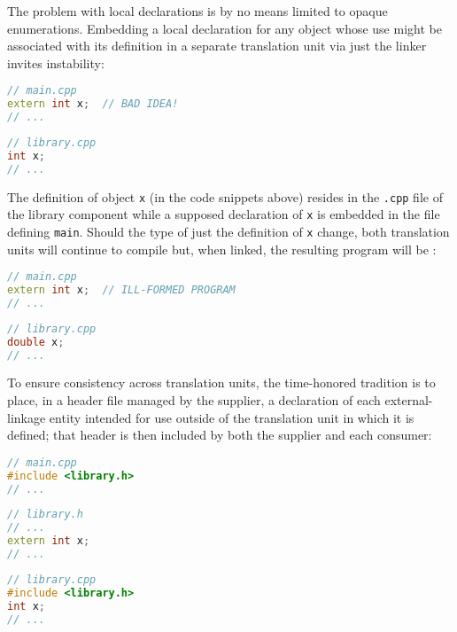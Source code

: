 The problem with local declarations is by no means limited to opaque
enumerations. Embedding a local declaration for any object whose use
might be associated with its definition in a separate translation unit
via just the linker invites instability:

\noindent\begin{minipage}{.45\textwidth}
\begin{lstlisting}[language=C++]
// main.cpp
extern int x;  // BAD IDEA!
// ...
\end{lstlisting}
\end{minipage}\hfill
\begin{minipage}{.45\textwidth}
\begin{lstlisting}[language=C++]
// library.cpp
int x;
// ...
\end{lstlisting}
\end{minipage}

\noindent The definition of object \lstinline!x! (in the code snippets above) resides
in the \lstinline!.cpp! file of the library component while a supposed
declaration of \lstinline!x! is embedded in the file defining
\lstinline!main!. Should the type of just the definition of \lstinline!x!
change, both translation units will continue to compile but, when
linked, the resulting program will be :

\noindent\begin{minipage}{.65\textwidth}
\begin{lstlisting}[language=C++]
// main.cpp
extern int x;  // ILL-FORMED PROGRAM
// ...
\end{lstlisting}
\end{minipage}\hfill
\begin{minipage}{.35\textwidth}
\begin{lstlisting}[language=C++]
// library.cpp
double x;
// ...
\end{lstlisting}
\end{minipage}

\noindent To ensure consistency across translation units, the time-honored
tradition is to place, in a header file managed by the supplier, a
declaration of each external-linkage entity intended for use outside of
the translation unit in which it is defined; that header is then
included by both the supplier and each consumer:

\noindent\begin{minipage}{.3\textwidth}
\begin{lstlisting}[language=C++]
// main.cpp
#include <library.h>
// ...
\end{lstlisting}
\end{minipage}\hfill
\begin{minipage}{.3\textwidth}
\begin{lstlisting}[language=C++]
// library.h
// ...
extern int x;
// ...
\end{lstlisting}
\end{minipage}
\begin{minipage}{.3\textwidth}
\begin{lstlisting}[language=C++]
// library.cpp
#include <library.h>
int x;
// ...
\end{lstlisting}
\end{minipage}

